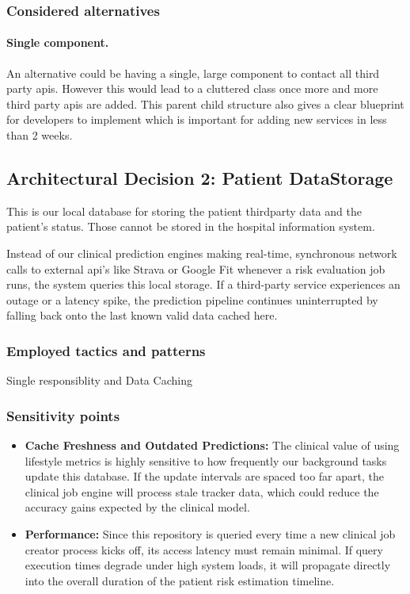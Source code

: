 \subsubsection*{Considered alternatives}
\paragraph{Single component.}
An alternative could be having a single, large component to contact all third party apis. However this would lead to a cluttered class once more and more third party apis are added. This parent child structure also gives a clear blueprint for developers to implement which is important for adding new services in less than 2 weeks.

\subsection*{Architectural Decision 2:
	Patient DataStorage }

This is our local database  for storing the patient thirdparty data and the patient's status. Those cannot be stored in the hospital information system.

Instead of our clinical prediction engines making real-time, synchronous network calls to external api's like Strava or Google Fit whenever a risk evaluation job runs, the system queries this local storage. If a third-party service experiences an outage or a latency spike, the prediction pipeline continues uninterrupted by falling back onto the last known valid data cached here.

\subsubsection*{Employed tactics and patterns}
Single responsiblity and Data Caching

\subsubsection*{Sensitivity points}
\begin{itemize}
	\item \textbf{Cache Freshness and Outdated Predictions:} The clinical value of using lifestyle metrics is highly sensitive to how frequently our background tasks update this database. If the update intervals are spaced too far apart, the clinical job engine will process stale tracker data, which could reduce the accuracy gains expected by the clinical model.
	\item \textbf{Performance:} Since this repository is queried every time a new clinical job creator process kicks off, its access latency must remain minimal. If query execution times degrade under high system loads, it will propagate directly into the overall duration of the patient risk estimation timeline.
\end{itemize}


